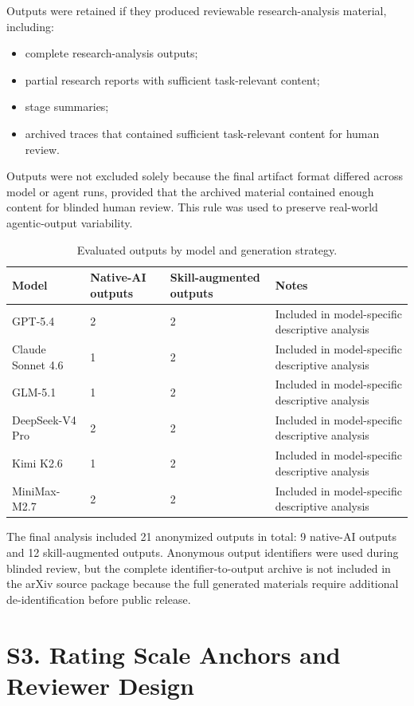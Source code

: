 Outputs were retained if they produced reviewable research-analysis material, including:

\begin{itemize}
\item complete research-analysis outputs;
\item partial research reports with sufficient task-relevant content;
\item stage summaries;
\item archived traces that contained sufficient task-relevant content for human review.
\end{itemize}

Outputs were not excluded solely because the final artifact format differed across model or agent runs, provided that the archived material contained enough content for blinded human review. This rule was used to preserve real-world agentic-output variability.

\begin{table}[htbp]
\centering
\caption{Evaluated outputs by model and generation strategy.}
\label{tab:supp-output-counts}
\small
\begin{tabularx}{\linewidth}{Y C{1.8cm} C{1.8cm} Y}
\toprule
Model & Native-AI outputs & Skill-augmented outputs & Notes \\
\midrule
GPT-5.4 & 2 & 2 & Included in model-specific descriptive analysis \\
Claude Sonnet 4.6 & 1 & 2 & Included in model-specific descriptive analysis \\
GLM-5.1 & 1 & 2 & Included in model-specific descriptive analysis \\
DeepSeek-V4 Pro & 2 & 2 & Included in model-specific descriptive analysis \\
Kimi K2.6 & 1 & 2 & Included in model-specific descriptive analysis \\
MiniMax-M2.7 & 2 & 2 & Included in model-specific descriptive analysis \\
\bottomrule
\end{tabularx}
\end{table}

The final analysis included 21 anonymized outputs in total: 9 native-AI outputs and 12 skill-augmented outputs. Anonymous output identifiers were used during blinded review, but the complete identifier-to-output archive is not included in the arXiv source package because the full generated materials require additional de-identification before public release.

\section{S3. Rating Scale Anchors and Reviewer Design}

